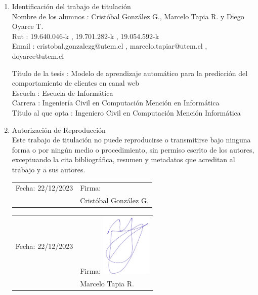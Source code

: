\begin{enumerate}
    \item Identificación del trabajo de titulación \\
    Nombre de los alumnos
    :   Cristóbal González G., Marcelo Tapia R. y Diego Oyarce T. \\
    Rut
    : 19.640.046-k , 19.701.282-k , 19.054.592-k \\
    Email
    : cristobal.gonzalezg@utem.cl , marcelo.tapiar@utem.cl , doyarce@utem.cl

    \vspace{0.1cm}

    Título de la tesis
    : Modelo de aprendizaje automático para la predicción del comportamiento de clientes en canal web \\
    Escuela
    : Escuela de Informática \\
    Carrera
    : Ingeniería Civil en Computación Mención en Informática \\
    Título al que opta
    : Ingeniero Civil en Computación Mención Informática \\
    \item Autorización de Reproducción \\
    Este trabajo de titulación no puede reproducirse o transmitirse bajo ninguna forma o por ningún medio o procedimiento, sin permiso escrito de los autores, exceptuando la cita bibliográfica, resumen y metadatos que acreditan al trabajo y a sus autores. \\

    \vspace{3cm}

    \begin{tabular}{@{}l l}
        Fecha: 22/12/2023 \hspace{3cm} & Firma:  \\
        & Cristóbal González G.
    \end{tabular}

    \vspace{3cm}

    \begin{tabular}{@{}l l}
        Fecha: 22/12/2023 \hspace{3cm} & Firma:  \includegraphics[height=3cm]{img/Firma Marcelo Tapia.jpg} \\
        & Marcelo Tapia R.
    \end{tabular}


\end{enumerate}
